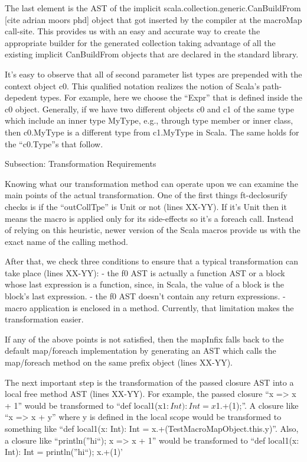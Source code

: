 The last element is the AST of the implicit
scala.collection.generic.CanBuildFrom [cite adrian moors phd] object that got
inserted by the compiler at the macroMap call-site. This provides us with an
easy and accurate way to create the appropriate builder for the generated
collection taking advantage of all the existing implicit CanBuildFrom objects
that are declared in the standard library.

It's easy to observe that all of second parameter list types are prepended
with the context object c0. This qualified notation realizes the notion of
Scala's path-depedent types. For example, here we choose the ``Expr'' that is
defined inside the c0 object. Generally, if we have two different objects c0 and
c1 of the same type which include an inner type MyType, e.g., through type
member or inner class,  then c0.MyType is a different type from c1.MyType in
Scala. The same holds for the ``c0.Type''s that follow.


Subsection: Transformation Requirements

Knowing what our transformation method can operate upon we can examine the
main points of the actual transformation. One of the first things ft-declosurify
checks is if the ``outCollTpe'' is Unit or not (lines XX-YY). If it's Unit then
it means the macro is applied only for its side-effects so it's a foreach call.
Instead of relying on this heuristic, newer version of the Scala macros provide
us with the exact name of the calling method.

After that, we check three conditions to ensure that a typical
transformation can take place (lines XX-YY):
- the f0 AST is actually a function AST or a block whose last
expression is a function, since, in Scala, the value of a block is the block's
last expression.
- the f0 AST doesn't contain any return expressions.
- macro application is enclosed in a method. Currently, that limitation makes
the transformation easier.

If any of the above points is not satisfied, then the mapInfix falls back to the
default map/foreach implementation by generating an AST which
calls the map/foreach method on the same prefix object (lines XX-YY).

The next important step is the transformation of the passed closure AST
into a local free method AST (lines XX-YY). For example, the passed closure ``x
=> x + 1'' would be transformed to ``def local1(x$1: Int): Int = x$1.+(1);''. A
closure like ``x => x + y'' where y is defined in the local scope would be
transformed to something like ``def local1(x: Int): Int =
x.+(TestMacroMapObject.this.y)''. Also, a closure like ``{println(''hi``); x =>
x + 1}'' would be transformed to ``def local1(x: Int): Int = {println(''hi``);
x.+(1)}'

